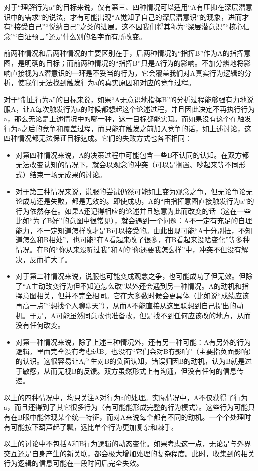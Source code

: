 \begin{explain}
对于“理解行为a”的目标来说，仅有第三、四种情况可以适用“A有压抑在深层潜意识中的需求”的说法，才有可能出现“A觉知了自己的深层潜意识”的现象，进而才有“接受自己”“悦纳自己”之类的进展。这不因我们将其称为“深层潜意识”“核心信念”“自证预言”还是什么别的名字而有所改变。

前两种情况和后两种情况的主要区别在于，后两种情况的“指挥B”作为A的指挥意图，是明确的目标；而前两种情况的“指挥B”只是A行为的影响。不加分辨地将影响直接视为A潜意识的一环是不妥当的行为，它会覆盖我们对A真实行为逻辑的分析，使我们无法找到触发行为a的真实原因和对应的竞争过程。

对于“制止行为a”的目标来说，如果“A无意识地指挥B”的分析过程能够强有力地说服A，让A每次触发行为a的时候都想起这个论述过程，并且因此决定不再执行行为a，那么无论是上述情况中的哪一种，这一目标都能实现。而如果没有这个在触发行为a之后的竞争和覆盖过程，而只能在触发之前加入竞争的话，如上述讨论，这四种情况都无法保证目标达成。它们的失败方式也各不相同：
\begin{itemize}
\item 对第四种情况来说，A的决策过程中可能包含一些B不认同的认知。在双方都无法改变认知的情况下，就会以观念的冲突（可以是搁置、吵起来等不同形式）结束一场无成果的讨论。
\item 对于第三种情况来说，说服的尝试仍然可能如上变为观念之争，但无论争论无论成功还是失败，都是无效的。即使成功，A的“由指挥意图直接触发行为a”的行为依然存在。如果A还记得相应的论述并且愿意为此而改变的话（这在一些比如“为了B好”的意图中很常见），就会遇到一个问题：A不一定有充足的自理能力，不一定知道怎样改才是B可以接受的。由此出现可能“A十分别扭，不知道怎么和B相处”，也可能“在A看起来改了很多，在B看起来没啥变化”等多种情况。在B的“你从来没听过我”和A的“你还要我怎么样”中，冲突不但没有解决，反而扩大了。
\item 对于第二种情况来说，说服也可能变成观念之争，也可能成功了但无效。但除了“A主动改变行为但不知道怎么改”以外还会遇到另一种情况。A的动机和指挥意图相关，但并不完全相同。它在大多数时候会更具体（比如说“成绩应该再高一点”“想找个人聊聊天”），从而A不能直接从这里联想到自己提出的动机。于是，A可能虽然同意改也准备改，但是找不到任何应该改的地方，从而没有任何改变。
\item 对第一种情况来说，除了上述三种情况外，还有另一种可能：A有另外的行为逻辑，里面完全没有考虑过B，也没有“它们会对B有影响”（主要指负面影响）的认识。这很容易让A产生对B的负面认知，错误归因B的动机，认为B就是过于敏感，从而无视B的反馈。双方虽然形式上有沟通，但没有任何的信息传递。
\end{itemize}
以上的四种情况中，均只关注A对行为a的处理。实际情况中，A不仅获得了行为a，而且还得到了其它很多行为（有可能能形成完整的行为模式）。这些行为可能只有在B眼中能体现某个统一特征，而对A来说每个都有不同的动机。一个个处理时有可能按下葫芦起了瓢，远比单个行为更加复杂和棘手。

以上的讨论中不包括A和B行为逻辑的动态变化。如果考虑这一点，无论是与外界交互还是自身产生的新关联，都会极大增加处理的复杂程度。此时，收集到的相关行为逻辑的信息可能在一段时间后完全失效。
\end{explain}

